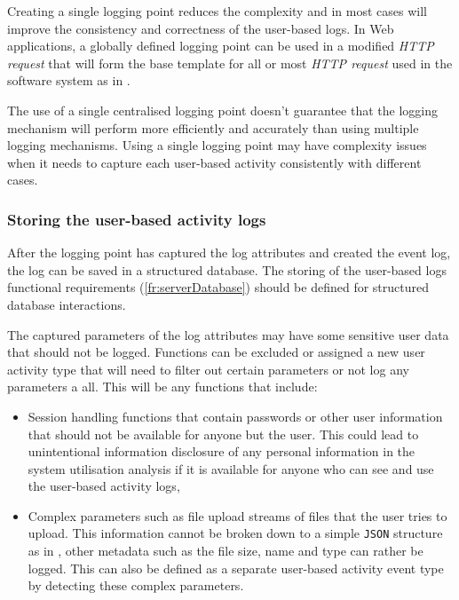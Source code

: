 Creating a single logging point reduces the complexity and in most cases will improve the consistency and correctness of the user-based logs. In Web applications, a globally defined logging point can be used in a modified \textit{HTTP request} that will form the base template for all or most \textit{HTTP request} used in the software system as in .\par The use of a single centralised logging point doesn't guarantee that the logging mechanism will perform more efficiently and accurately than using multiple logging mechanisms. Using a single logging point may have complexity issues when it needs to capture each user-based activity consistently with different cases.

\subsubsection{Storing the user-based activity logs}\label{sec:ch2_databaseStorage}
After the logging point has captured the log attributes and created the event log, the log can be saved in a structured database. The storing of the user-based logs functional requirements (\ref{fr:serverDatabase}) should be defined for structured database interactions.\par The captured parameters of the log attributes may have some sensitive user data that should not be logged. Functions can be excluded or assigned a new user activity type that will need to filter out certain parameters or not log any parameters a all. This will be any functions that include:

\begin{itemize}
	\item Session handling functions that contain passwords or other user information that should not be available for anyone but the user. This could lead to unintentional information disclosure of any personal information in the system utilisation analysis if it is available for anyone who can see and use the user-based activity logs,
	\item Complex parameters such as file upload streams of files that the user tries to upload. This information cannot be broken down to a simple \texttt{JSON} structure as in , other metadata such as the file size, name and type can rather be logged. This can also be defined as a separate user-based activity event type by detecting these complex parameters.
\end{itemize}

